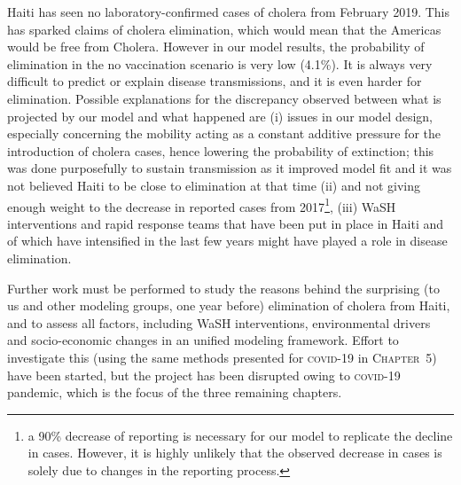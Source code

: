 Haiti has seen no laboratory-confirmed cases of cholera from February 2019. This has sparked claims of cholera elimination, which would mean that the Americas would be free from Cholera. However in our model results, the probability of elimination in the no vaccination scenario is very low (4.1\%). It is always very difficult to predict or explain disease transmissions, and it is even harder for elimination. Possible explanations for the discrepancy observed between what is projected by our model and what happened are (i) issues in our model design, especially concerning the mobility acting as a constant additive pressure for the introduction of cholera cases, hence lowering the probability of extinction; this was done purposefully to sustain transmission as it improved model fit and it was not believed Haiti to be close to elimination at that time (ii) and not giving enough weight to the decrease in reported cases from 2017\footnote[][-1.5\baselineskip]{a 90\% decrease of reporting is necessary for our model to replicate the decline in cases. However, it is highly unlikely that the observed decrease in cases is solely due to changes in the reporting process.}, (iii) WaSH interventions and rapid response teams that have been put in place in Haiti and of which have intensified in the last few years\cite{Rebaudet:CaseareaTargetedRapid:2019} might have played a role in disease elimination.
  
 Further work must be performed to study the reasons behind the surprising (to us and other modeling groups, one year before) elimination of cholera from Haiti, and to assess all factors, including WaSH interventions, environmental drivers and socio-economic changes in an unified modeling framework. Effort to investigate this (using the same methods presented for \textsc{covid}-19 in \textsc{Chapter~5}) have been started, but the project has been disrupted owing to \textsc{covid}-19 pandemic, which is the focus of the three remaining chapters.
 